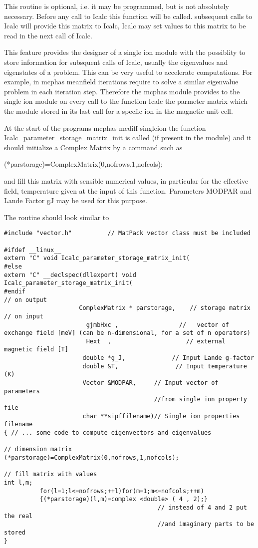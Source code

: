 This routine is optional, i.e. it may be programmed, but is not absolutely necessary.
Before any call to Icalc this function will be called. subsequent calls to Icalc will provide this matrix to %
Icalc, Icalc may set values to this matrix to be read in the next call
of Icalc.

This feature provides the designer of a single ion module  with the possiblity to store information for subsquent %
calls of Icalc,
 usually the eigenvalues and eigenstates of a problem. This can be very useful to accelerate computations. For %
example, in {\prg mcphas} meanfield iterations require
to solve a similar eigenvalue problem in each iteration step. Therefore the {\prg mcphas} module provides
to the single ion module on every call to the function {\prg Icalc} the parmeter matrix {\prg }
which the module stored in its last call for a specfic ion in the magnetic unit cell.

At the start of the programs {\prg mcphas} {\prg mcdiff} {\prg singleion} the function {\prg %
Icalc\_parameter\_storage\_matrix\_init}
is called (if present in the module) and it should initialize a Complex Matrix by a command such as

{\prg (*parstorage)=ComplexMatrix(0,nofrows,1,nofcols);}

and fill this matrix with sensible numerical values, in particular for the effective field, temperature given at %
the input of this function.
Parameters {\prg MODPAR} and Lande Factor {\prg gJ} may be used for this purpose.

The routine should look similar to
{\footnotesize
\begin{verbatim}
#include "vector.h"          // MatPack vector class must be included

#ifdef __linux__
extern "C" void Icalc_parameter_storage_matrix_init(
#else
extern "C" __declspec(dllexport) void Icalc_parameter_storage_matrix_init(
#endif
// on output
                     ComplexMatrix * parstorage,    // storage matrix
// on input
                       gjmbHxc ,                 //   vector of exchange field [meV] (can be n-dimensional, for a set of n operators)
                       Hext  ,                     // external magnetic field [T]
                      double *g_J,             // Input Lande g-factor
                      double &T,                // Input temperature (K)
                      Vector &MODPAR,     // Input vector of parameters 
					                      //from single ion property file
                      char **sipffilename)// Single ion properties filename
{ // ... some code to compute eigenvectors and eigenvalues

// dimension matrix
(*parstorage)=ComplexMatrix(0,nofrows,1,nofcols);

// fill matrix with values
int l,m;
          for(l=1;l<=nofrows;++l)for(m=1;m<=nofcols;++m)
          {(*parstorage)(l,m)=complex <double> ( 4 , 2);}
                                           // instead of 4 and 2 put the real 
										   //and imaginary parts to be stored
}
\end{verbatim}
}


